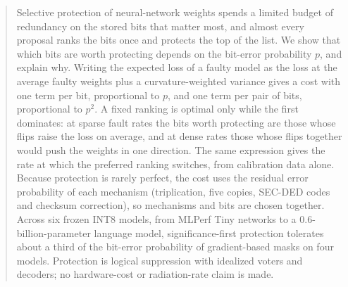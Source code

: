 \documentclass[manuscript,screen,review]{acmart}
\begin{document}
\begin{abstract}
Selective protection of neural-network weights spends a limited budget of redundancy on the stored bits that matter most, and almost every proposal ranks the bits once and protects the top of the list. We show that which bits are worth protecting depends on the bit-error probability $p$, and explain why. Writing the expected loss of a faulty model as the loss at the average faulty weights plus a curvature-weighted variance gives a cost with one term per bit, proportional to $p$, and one term per pair of bits, proportional to $p^2$. A fixed ranking is optimal only while the first dominates: at sparse fault rates the bits worth protecting are those whose flips raise the loss on average, and at dense rates those whose flips together would push the weights in one direction. The same expression gives the rate at which the preferred ranking switches, from calibration data alone.  Because protection is rarely perfect, the cost uses the residual error probability of each mechanism (triplication, five copies, SEC-DED codes and checksum correction), so mechanisms and bits are chosen together.  Across six frozen INT8 models, from MLPerf Tiny networks to a 0.6-billion-parameter language model, significance-first protection tolerates about a third of the bit-error probability of gradient-based masks on four models. Protection is logical suppression with idealized voters and decoders; no hardware-cost or radiation-rate claim is made.
\end{abstract}
\maketitle


\end{document}
